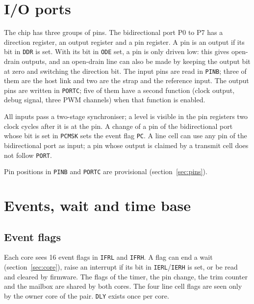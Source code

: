 \documentclass[10pt,a4paper]{article}
\newcommand{\reg}[1]{\texttt{#1}}
\begin{document}


\section{I/O ports}\label{sec:ports}

The chip has three groups of pins. The bidirectional port P0 to P7 has a direction register, an output
register and a pin register. A pin is an output if its bit in \reg{DDR} is set. With its bit in \reg{ODE} set, a pin
is only driven low: this gives open-drain outputs, and an open-drain line can also be made by keeping the
output bit at zero and switching the direction bit. The input pins are read in \reg{PINB}; three of them are the
host link and two are the strap and the reference input. The output pins are written in \reg{PORTC}; five of
them have a second function (clock output, debug signal, three PWM channels) when that function is enabled.

All inputs pass a two-stage synchroniser; a level is visible in the pin registers two clock cycles after it is
at the pin. A change of a pin of the bidirectional port whose bit is set in \reg{PCMSK} sets the event flag
\reg{PC}. A line cell can use any pin of the bidirectional port as input; a pin whose output is claimed by a
transmit cell does not follow \reg{PORT}.



\noindent Pin positions in \reg{PINB} and \reg{PORTC} are provisional (section~\ref{sec:pins}).

\section{Events, wait and time base}\label{sec:events}

\subsection{Event flags}

Each core sees 16 event flags in \reg{IFRL} and \reg{IFRH}. A flag can end a wait (section~\ref{sec:core}), raise an
interrupt if its bit in \reg{IERL}/\reg{IERH} is set, or be read and cleared by firmware. The flags of the timer,
the pin change, the trim counter and the mailbox are shared by both cores. The four line cell flags are seen
only by the owner core of the pair. \reg{DLY} exists once per core.


\end{document}
